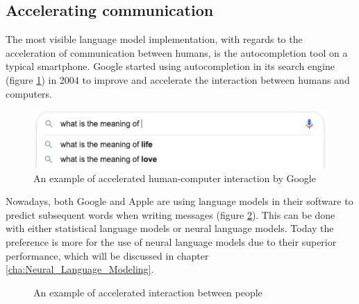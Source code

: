 \subsection{Accelerating communication}

The most visible language model implementation, with regards to the acceleration of communication between humans, is the autocompletion tool on a typical smartphone. Google started using autocompletion in its search engine (figure \ref{fig:google_search}) in 2004 to improve and accelerate the interaction between humans and computers.

\begin{figure}[!htbp]
    \centering
    \includegraphics[width=\textwidth,height=\textheight,keepaspectratio]{google_search}
    \caption{An example of accelerated human-computer interaction by Google}
    \label{fig:google_search}
\end{figure}

Nowadays, both Google and Apple are using language models in their software to predict subsequent words when writing messages (figure \ref{fig:predictictive_writing}). This can be done with either statistical language models or neural language models. Today the preference is more for the use of neural language models due to their superior performance, which will be discussed in chapter \ref{cha:Neural_Language_Modeling}.

\begin{figure}[!htbp]
    \centering
    \qquad
    \caption{An example of accelerated interaction between people}%
    \label{fig:predictictive_writing}%
\end{figure}


